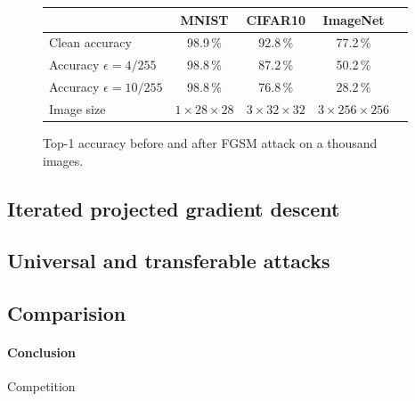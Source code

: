 \documentclass[]{scrarticle}
\begin{document}
\begin{figure}[h]
  \centering
  \begin{tabular}{l|cccc}
    & MNIST & CIFAR10 & ImageNet \\ \hline
    Clean accuracy	& 98.9\,\%	& 92.8\,\%	& 77.2\,\%	& \\
    Accuracy $\epsilon=4/255$	& 98.8\,\%	& 87.2\,\%	& 50.2\,\%	& \\
    Accuracy $\epsilon=10/255$	& 98.8\,\%	& 76.8\,\%	& 28.2\,\%	& \\
    Image size & $1 \times 28 \times 28$ & $3 \times 32 \times 32$ & $3 \times 256 \times 256$\footnotemark
  \end{tabular}
  \caption{Top-1 accuracy before and after FGSM attack on a thousand images.}
  \label{fig:dataset_sizes}
\end{figure}



\subsection{Iterated projected gradient descent}


\subsection{Universal and transferable attacks}

\subsection{Comparision}


\paragraph{Conclusion}

Competition \cite{Kurakin2018AdversarialAA}
\end{document}
